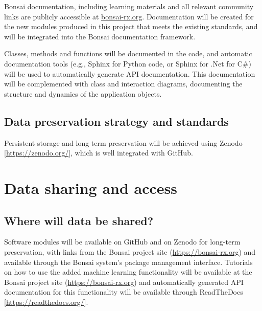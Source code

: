 \documentclass[a4paper,11pt]{article}
\begin{document}
Bonsai documentation, including learning materials and all relevant community
links are publicly accessible at \url{bonsai-rx.org}.
Documentation will be created for the new modules produced in this project that
meets the existing standards, and will be integrated into the Bonsai
documentation framework.

Classes, methods and functions will be documented in the code, and automatic
documentation tools (e.g., Sphinx for Python code, or Sphinx for .Net for C\#)
will be used to automatically generate API documentation. This documentation
will be complemented with class and interaction diagrams, documenting the
structure and dynamics of the application objects.

\subsection{Data preservation strategy and standards}


Persistent storage and long term preservation will be achieved using
Zenodo [\url{https://zenodo.org/}], which is well integrated with
GitHub.



\section{Data sharing and access}
\subsection{Where will data be shared?}
Software modules will be available on GitHub and on Zenodo for long-term
preservation, with links from the Bonsai project site
(\url{https://bonsai-rx.org}) and available through the Bonsai system's package
management interface. Tutorials on how to use the added machine learning
functionality will be available at the Bonsai project site
(\url{https://bonsai-rx.org}) and automatically generated API documentation for
this functionality will be available through ReadTheDocs [\url{https://readthedocs.org/}].
\end{document}
